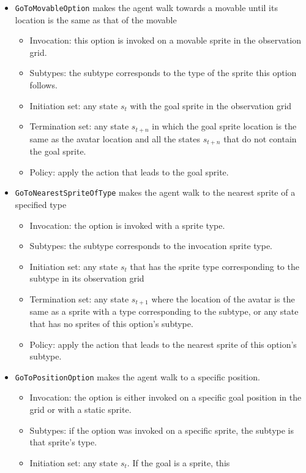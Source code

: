 \begin{itemize}
	\item \texttt{GoToMovableOption} makes the agent walk towards a
		movable until its location is the same as that of the movable
		\begin{itemize}
			\item Invocation: this option is invoked on a movable sprite in the
				observation grid.
			\item Subtypes: the subtype corresponds to the type of the sprite
				this option follows.
			\item Initiation set: any state $s_t$ with the goal sprite in the
				observation grid
			\item Termination set: any state $s_{t+n}$ in which the goal sprite
				location is the same as the avatar location and all the states
				$s_{t+n}$ that do not contain the goal sprite.
			\item Policy: apply the action that leads to the goal sprite.
		\end{itemize}
	\item \texttt{GoToNearestSpriteOfType} makes the agent walk to the nearest
		sprite of a specified type
		\begin{itemize}
			\item Invocation: the option is invoked with a sprite type.
			\item Subtypes: the subtype corresponds to the invocation sprite type.
			\item Initiation set: any state $s_t$ that has the sprite type
				corresponding to the subtype in its observation grid
			\item Termination set: any state $s_{t+1}$ where the location of the
				avatar is the same as a sprite with a type corresponding to
				the subtype, or any state that has no sprites of this option's
				subtype.
			\item Policy: apply the action that leads to the nearest
				sprite of this option's subtype.
		\end{itemize}
	\item \texttt{GoToPositionOption} makes the agent walk to a specific
		position.
		\begin{itemize}
			\item Invocation: the option is either invoked on a specific goal
				position in the grid or with a static sprite.
			\item Subtypes: if the option was invoked on a specific sprite, the
				subtype is that sprite's type.
			\item Initiation set: any state $s_t$. If the goal is a sprite, this

\end{itemize}
\end{itemize}
